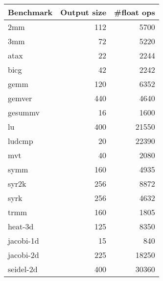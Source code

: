 \begin{tabular}{lrr}
\toprule
\bfseries{Benchmark} & \bfseries{Output size} & \bfseries{\#float ops} \\
\midrule
                 2mm &                    112 &                   5700 \\
                 3mm &                     72 &                   5220 \\
                atax &                     22 &                   2244 \\
                bicg &                     42 &                   2242 \\
                gemm &                    120 &                   6352 \\
              gemver &                    440 &                   4640 \\
             gesummv &                     16 &                   1600 \\
                  lu &                    400 &                  21550 \\
              ludcmp &                     20 &                  22390 \\
                 mvt &                     40 &                   2080 \\
                symm &                    160 &                   4935 \\
               syr2k &                    256 &                   8872 \\
                syrk &                    256 &                   4632 \\
                trmm &                    160 &                   1805 \\
             heat-3d &                    125 &                   8350 \\
           jacobi-1d &                     15 &                    840 \\
           jacobi-2d &                    225 &                  18250 \\
           seidel-2d &                    400 &                  30360 \\
\bottomrule
\end{tabular}
